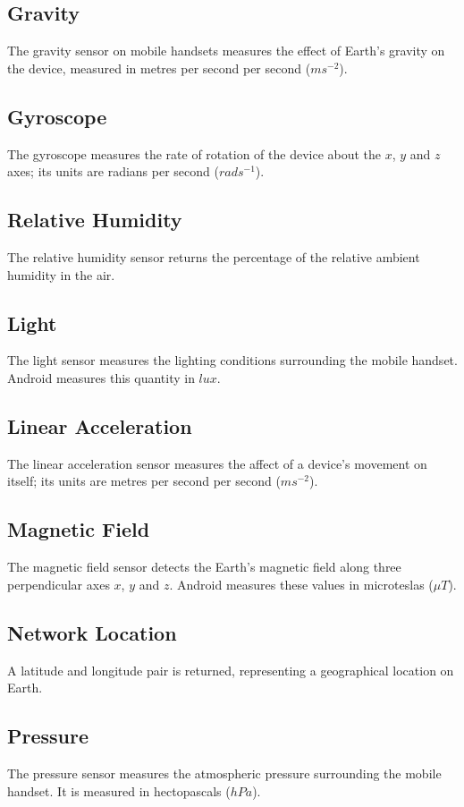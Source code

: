 \documentclass[runningheads,a4paper]{llncs}
\begin{document}
\subsection{Gravity}
The gravity sensor on mobile handsets measures the effect of Earth's gravity on the device, measured in metres per second per second ($ms^{-2}$).

\subsection{Gyroscope}
The gyroscope measures the rate of rotation of the device about the $x$, $y$ and $z$ axes; its units are radians per second ($rads^{-1}$).

\subsection{Relative Humidity}
The relative humidity sensor returns the percentage of the relative ambient humidity in the air.

\subsection{Light}
The light sensor measures the lighting conditions surrounding the mobile handset.  Android measures this quantity in $lux$.

\subsection{Linear Acceleration}
The linear acceleration sensor measures the affect of a device's movement on itself; its units are metres per second per second ($ms^{-2}$).

\subsection{Magnetic Field}
The magnetic field sensor detects the Earth's magnetic field along three perpendicular axes $x$, $y$ and $z$.  Android measures these values in microteslas ($\mu T$).

\subsection{Network Location}
A latitude and longitude pair is returned, representing a geographical location on Earth.

\subsection{Pressure}
The pressure sensor measures the atmospheric pressure surrounding the mobile handset. It is measured in hectopascals ($hPa$).
\end{document}
